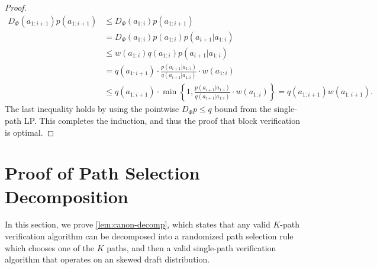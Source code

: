 \documentclass{article}
\theoremstyle{plain}
\theoremstyle{definition}
\theoremstyle{remark}
\begin{document}
\begin{proof}
    \begin{align}
        D_\Phi(a_{1:i+1})p(a_{1:i+1}) &\leq D_\Phi(a_{1:i}) p(a_{1:i+1}) \\
        &= D_\Phi(a_{1:i}) p(a_{1:i}) p(a_{i+1}|a_{1:i}) \\
        &\leq w(a_{1:i})q(a_{1:i})  p(a_{i+1}|a_{1:i}) \\
        &= q(a_{1:i+1}) \cdot \frac{p(a_{i+1}|a_{1:i})}{q(a_{i+1}|a_{1:i})} \cdot w(a_{1:i})\\
        &\leq q(a_{1:i+1})  \cdot \min\left\{1,\frac{p(a_{i+1}|a_{1:i})}{q(a_{i+1}|a_{1:i})} \cdot w(a_{1:i})\right\} = q(a_{1:i+1} ) w(a_{1:i+1}).
    \end{align}
    The last inequality holds by using the pointwise $D_\Phi p \leq q$ bound from the single-path LP. This completes the induction, and thus the proof that block verification is optimal. 
    
\end{proof}

\section{Proof of Path Selection Decomposition}
\label{appendix:canon-decomp}

In this section, we prove \cref{lem:canon-decomp}, which states that any valid $K$-path verification algorithm can be decomposed into a randomized path selection rule which chooses one of the $K$ paths, and then a valid single-path verification algorithm that operates on an skewed draft distribution. 
\end{document}
